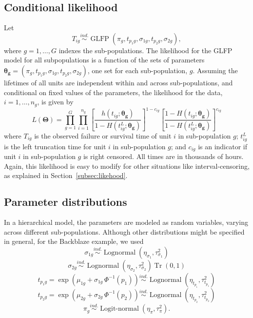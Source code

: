 \documentclass[11pt]{article}
\newcommand{\ind}{\stackrel{ind.}{\sim}}
\newcommand{\op}{\operatorname}
\begin{document}
\subsection{Conditional likelihood}
Let
\begin{equation}
T_{ig} \ind \op{GLFP}\left( \pi_g, t_{p_{1}g}, \sigma_{1g}, t_{p_{2}g}, \sigma_{2g} \right),
\end{equation}
where $g=1,\ldots,G$ indexes the sub-populations.  The likelihood for the GLFP model for all subpopulations is a function of the sets of parameters $\bm{\theta_g} = (\pi_{g}, t_{p_{1}g}, \sigma_{1g}, t_{p_{2}g}, \sigma_{2g})$, one set for each sub-population, $g$.  Assuming the lifetimes of all units are independent within and across sub-populations, and conditional on fixed values of the parameters, the likelihood for the data, $i=1,\dots,n_g$,  is given by
\begin{equation*}
L(\bm{\Theta})= \prod_{g=1}^{G} \prod_{i=1}^{n_{g}} \left[\frac{h(t_{ig};\bm{\theta_g})}{1-H(t_{ig}^L;\bm{\theta_g})}\right]^{1-c_{ig}} \left[ \frac{1-H(t_{ig};\bm{\theta_g})}{1-H(t_{ig}^L;\bm{\theta_g})} \right]^{c_{ig}}
\end{equation*}
where $T_{ig}$ is the observed failure or survival time of unit $i$ in sub-population $g$; $t_{ig}^L$ is the left truncation time for unit $i$ in sub-population $g$; and $c_{ig}$ is an indicator if unit $i$ in sub-population $g$ is right censored. All times are in thousands of hours.  Again, this likelihood
is easy to modify for other situations like interval-censoring,
as explained in Section~\ref{subsec:likehood}.

\subsection{Parameter distributions}

In a hierarchical model, the parameters are modeled as random variables, varying across different sub-populations.  Although other distributions might be specified in general, for the Backblaze example, we used
\begin{equation*}
\sigma_{1g} \ind \op{Lognormal} \left( \eta_{\sigma_1}, \tau^2_{\sigma_1} \right)
\end{equation*}
\begin{equation*}
\sigma_{2g} \ind \op{Lognormal} \left( \eta_{\sigma_2}, \tau^2_{\sigma_2}\right)\op{Tr}\left(0, 1\right)
\end{equation*}
\begin{equation}
\label{eq:hier-model}
t_{p_{1}g} = \exp\left(\mu_{1g} + \sigma_{1g}\,\Phi^{-1}(p_1)\right)  \ind \op{Lognormal} \left(\eta_{t_{p_1}}, \tau^2_{t_{p_1}}\right)
\end{equation}
\begin{equation*}
t_{p_{2}g} = \exp\left(\mu_{2g} + \sigma_{2g}\,\Phi^{-1}(p_2)\right)  \ind \op{Lognormal} \left(\eta_{t_{p_2}}, \tau^2_{t_{p_2}}\right)
\end{equation*}
\begin{equation*}
\pi_g \ind \op{Logit-normal}(\eta_\pi, \tau^2_\pi).
\end{equation*}
\end{document}
